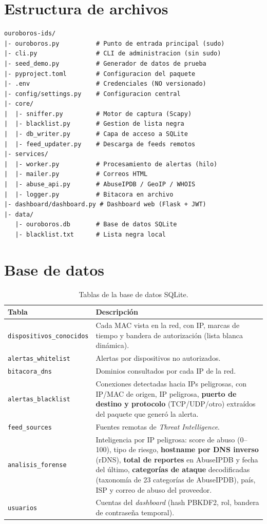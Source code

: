 \documentclass[12pt,letterpaper]{report}
\begin{document}
\section{Estructura de archivos}

\begin{lstlisting}
ouroboros-ids/
|- ouroboros.py          # Punto de entrada principal (sudo)
|- cli.py                # CLI de administracion (sin sudo)
|- seed_demo.py          # Generador de datos de prueba
|- pyproject.toml        # Configuracion del paquete
|- .env                  # Credenciales (NO versionado)
|- config/settings.py    # Configuracion central
|- core/
|  |- sniffer.py         # Motor de captura (Scapy)
|  |- blacklist.py       # Gestion de lista negra
|  |- db_writer.py       # Capa de acceso a SQLite
|  |- feed_updater.py    # Descarga de feeds remotos
|- services/
|  |- worker.py          # Procesamiento de alertas (hilo)
|  |- mailer.py          # Correos HTML
|  |- abuse_api.py       # AbuseIPDB / GeoIP / WHOIS
|  |- logger.py          # Bitacora en archivo
|- dashboard/dashboard.py # Dashboard web (Flask + JWT)
|- data/
   |- ouroboros.db       # Base de datos SQLite
   |- blacklist.txt      # Lista negra local
\end{lstlisting}

\section{Base de datos}

\begin{table}[H]
\centering
\caption{Tablas de la base de datos SQLite.}
\label{tab:tablas}
\begin{tabular}{lp{8.6cm}}
\toprule
\textbf{Tabla} & \textbf{Descripción} \\
\midrule
\texttt{dispositivos\_conocidos} & Cada MAC vista en la red, con IP,
  marcas de tiempo y bandera de autorización (lista blanca dinámica). \\
\texttt{alertas\_whitelist} & Alertas por dispositivos no autorizados. \\
\texttt{bitacora\_dns} & Dominios consultados por cada IP de la red. \\
\texttt{alertas\_blacklist} & Conexiones detectadas hacia IPs peligrosas, con
  IP/MAC de origen, IP peligrosa, \textbf{puerto de destino y protocolo}
  (TCP/UDP/otro) extraídos del paquete que generó la alerta. \\
\texttt{feed\_sources} & Fuentes remotas de \textit{Threat Intelligence}. \\
\texttt{analisis\_forense} & Inteligencia por IP peligrosa: score de abuso
  (0--100), tipo de riesgo, \textbf{hostname por DNS inverso} (rDNS),
  \textbf{total de reportes} en AbuseIPDB y fecha del último, \textbf{categorías
  de ataque} decodificadas (taxonomía de 23 categorías de AbuseIPDB), país,
  ISP y correo de abuso del proveedor. \\
\texttt{usuarios} & Cuentas del \textit{dashboard} (hash PBKDF2, rol,
  bandera de contraseña temporal). \\
\bottomrule
\end{tabular}
\end{table}
\end{document}
